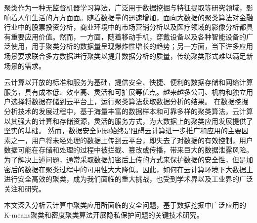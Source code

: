 \begin{cabstract}
%

聚类作为一种无监督机器学习算法，广泛用于数据挖掘与特征提取等研究领域，影响着人们生活的方方面面。随着数据量的迅速增加，面向大数据的聚类算法对金融行业中的股票投资分析，商业环境中的市场营销分析以及医疗领域的影像分析都具有重要应用价值。然而，一方面，随着移动手机，穿戴设备以及各种智能设备的广泛使用，用于聚类分析的数据量呈现爆炸性增长的趋势；另一方面，当下许多应用场景要求联合多方数据进行聚类以提升数据分析的质量，传统聚类形式难以满足新场景的需求。

云计算以开放的标准和服务为基础，提供安全、快捷、便利的数据存储和网络计算服务，具有成本低、效率高、灵活和可扩展等优点。越来越多公司、机构和独立用户选择将数据存储到云平台上，运行聚类算法获取数据分析的结果。
在数据挖掘分析技术的发展过程中，基于海量丰富的数据样本和可靠多样的聚类算法，云计算以其强大的计算和存储资源，灵活的服务方式，为大数据上的聚类应用发展提供了坚实的基础。
然而，数据安全问题始终是阻碍云计算进一步推广和应用的主要因素之一，用户将未经处理的数据上传到云平台，即失去了对数据的有效控制，用户数据可能在存储和处理的过程中被拦截、篡改或传播，带来巨大的数据泄露风险。为了解决上述问题，通常采取数据加密后上传的方式来保护数据的安全性，但是加密后的数据在聚类过程中的可用性大大降低。因此，如何在云计算环境下大数据上进行安全高效的聚类，成为我们面临的重大挑战，也受到学术界以及工业界的广泛关注和研究。

本文深入分析云计算中聚类应用所面临的安全问题，基于数据挖掘中广泛应用的K-means聚类和密度聚类算法开展隐私保护问题的关键技术研究。


\end{cabstract}
